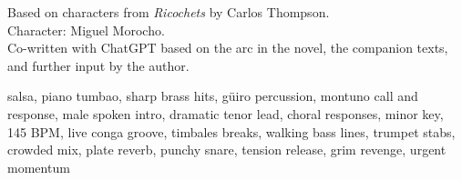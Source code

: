 

\begin{notes}
Based on characters from \emph{Ricochets} by Carlos Thompson.\\
Character: Miguel Morocho.\\
Co-written with ChatGPT based on the arc in the novel, the companion texts, and further input by the author.
\end{notes}

\begin{style}
salsa, piano tumbao, sharp brass hits, güiro percussion, montuno call and response, male spoken intro, dramatic tenor lead, choral responses, minor key, 145 BPM, live conga groove, timbales breaks, walking bass lines, trumpet stabs, crowded mix, plate reverb, punchy snare, tension release, grim revenge, urgent momentum
\end{style}

